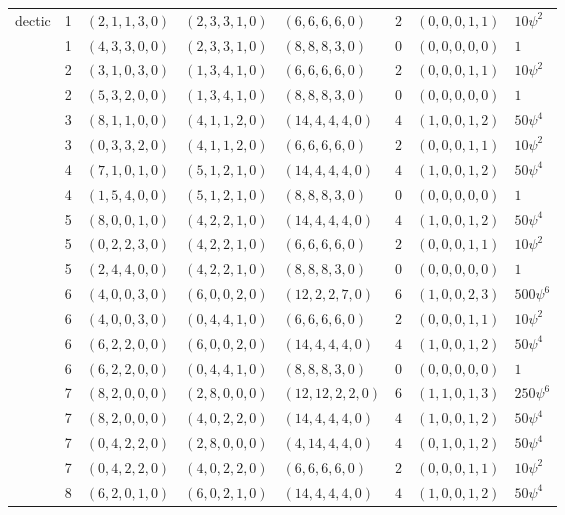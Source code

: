 \begin{table}[t]
\begin{adjustbox}{max width=\linewidth}
\begin{tabular}{lrlllrll}
\midrule
dectic & 1 & $(2,1,1,3,0)$ & $(2,3,3,1,0)$ & $(6,6,6,6,0)$ & $2$ & $(0,0,0,1,1)$ & $10\psi^{2}$\\
 & 1 & $(4,3,3,0,0)$ & $(2,3,3,1,0)$ & $(8,8,8,3,0)$ & $0$ & $(0,0,0,0,0)$ & $1$\\
 & 2 & $(3,1,0,3,0)$ & $(1,3,4,1,0)$ & $(6,6,6,6,0)$ & $2$ & $(0,0,0,1,1)$ & $10\psi^{2}$\\
 & 2 & $(5,3,2,0,0)$ & $(1,3,4,1,0)$ & $(8,8,8,3,0)$ & $0$ & $(0,0,0,0,0)$ & $1$\\
 & 3 & $(8,1,1,0,0)$ & $(4,1,1,2,0)$ & $(14,4,4,4,0)$ & $4$ & $(1,0,0,1,2)$ & $50\psi^{4}$\\
 & 3 & $(0,3,3,2,0)$ & $(4,1,1,2,0)$ & $(6,6,6,6,0)$ & $2$ & $(0,0,0,1,1)$ & $10\psi^{2}$\\
 & 4 & $(7,1,0,1,0)$ & $(5,1,2,1,0)$ & $(14,4,4,4,0)$ & $4$ & $(1,0,0,1,2)$ & $50\psi^{4}$\\
 & 4 & $(1,5,4,0,0)$ & $(5,1,2,1,0)$ & $(8,8,8,3,0)$ & $0$ & $(0,0,0,0,0)$ & $1$\\
 & 5 & $(8,0,0,1,0)$ & $(4,2,2,1,0)$ & $(14,4,4,4,0)$ & $4$ & $(1,0,0,1,2)$ & $50\psi^{4}$\\
 & 5 & $(0,2,2,3,0)$ & $(4,2,2,1,0)$ & $(6,6,6,6,0)$ & $2$ & $(0,0,0,1,1)$ & $10\psi^{2}$\\
 & 5 & $(2,4,4,0,0)$ & $(4,2,2,1,0)$ & $(8,8,8,3,0)$ & $0$ & $(0,0,0,0,0)$ & $1$\\
 & 6 & $(4,0,0,3,0)$ & $(6,0,0,2,0)$ & $(12,2,2,7,0)$ & $6$ & $(1,0,0,2,3)$ & $500\psi^{6}$\\
 & 6 & $(4,0,0,3,0)$ & $(0,4,4,1,0)$ & $(6,6,6,6,0)$ & $2$ & $(0,0,0,1,1)$ & $10\psi^{2}$\\
 & 6 & $(6,2,2,0,0)$ & $(6,0,0,2,0)$ & $(14,4,4,4,0)$ & $4$ & $(1,0,0,1,2)$ & $50\psi^{4}$\\
 & 6 & $(6,2,2,0,0)$ & $(0,4,4,1,0)$ & $(8,8,8,3,0)$ & $0$ & $(0,0,0,0,0)$ & $1$\\
 & 7 & $(8,2,0,0,0)$ & $(2,8,0,0,0)$ & $(12,12,2,2,0)$ & $6$ & $(1,1,0,1,3)$ & $250\psi^{6}$\\
 & 7 & $(8,2,0,0,0)$ & $(4,0,2,2,0)$ & $(14,4,4,4,0)$ & $4$ & $(1,0,0,1,2)$ & $50\psi^{4}$\\
 & 7 & $(0,4,2,2,0)$ & $(2,8,0,0,0)$ & $(4,14,4,4,0)$ & $4$ & $(0,1,0,1,2)$ & $50\psi^{4}$\\
 & 7 & $(0,4,2,2,0)$ & $(4,0,2,2,0)$ & $(6,6,6,6,0)$ & $2$ & $(0,0,0,1,1)$ & $10\psi^{2}$\\
 & 8 & $(6,2,0,1,0)$ & $(6,0,2,1,0)$ & $(14,4,4,4,0)$ & $4$ & $(1,0,0,1,2)$ & $50\psi^{4}$\\

\end{tabular}
\end{adjustbox}
\end{table}
